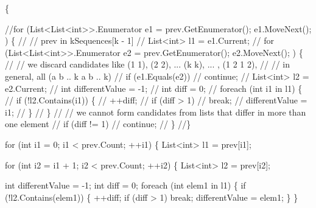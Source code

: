 \begin{DoxyCode}
                                                                               
                                   \{

            \textcolor{comment}{//for (List<List<int>>.Enumerator e1 = prev.GetEnumerator();
       e1.MoveNext(); ) \{}
            \textcolor{comment}{//   // prev in kSequences[k - 1]}
            \textcolor{comment}{//   List<int> l1 = e1.Current;}
            \textcolor{comment}{//   for (List<List<int>>.Enumerator e2 = prev.GetEnumerator();
       e2.MoveNext(); ) \{}
            \textcolor{comment}{//      // we discard candidates like (1 1), (2 2), ... (k k), ...
       , (1 2 1 2),}
            \textcolor{comment}{//      // in general, all (a b .. k a b .. k)}
            \textcolor{comment}{//      if (e1.Equals(e2))}
            \textcolor{comment}{//         continue;}
            \textcolor{comment}{//      List<int> l2 = e2.Current;}
            \textcolor{comment}{//      int differentValue = -1;}
            \textcolor{comment}{//      int diff = 0;}
            \textcolor{comment}{//      foreach (int i1 in l1) \{}
            \textcolor{comment}{//         if (!l2.Contains(i1)) \{}
            \textcolor{comment}{//            ++diff;}
            \textcolor{comment}{//            if (diff > 1)}
            \textcolor{comment}{//               break;}
            \textcolor{comment}{//            differentValue = i1;}
            \textcolor{comment}{//         \}}
            \textcolor{comment}{//      \}}
            \textcolor{comment}{//      // we cannot form candidates from lists that differ in more
       than one element}
            \textcolor{comment}{//      if (diff != 1)}
            \textcolor{comment}{//         continue;}
            \textcolor{comment}{//   \}}
            \textcolor{comment}{//\}}

            \textcolor{keywordflow}{for} (\textcolor{keywordtype}{int} i1 = 0; i1 < prev.Count; ++i1) \{
                List<int> l1 = prev[i1];

                \textcolor{keywordflow}{for} (\textcolor{keywordtype}{int} i2 = i1 + 1; i2 < prev.Count; ++i2) \{
                    List<int> l2 = prev[i2];

                    \textcolor{keywordtype}{int} differentValue = -1;
                    \textcolor{keywordtype}{int} diff = 0;
                    \textcolor{keywordflow}{foreach} (\textcolor{keywordtype}{int} elem1 \textcolor{keywordflow}{in} l1) \{
                        \textcolor{keywordflow}{if} (!l2.Contains(elem1)) \{
                            ++diff;
                            \textcolor{keywordflow}{if} (diff > 1)
                                \textcolor{keywordflow}{break};
                            differentValue = elem1;
                        \}
                    \}


\end{DoxyCode}
